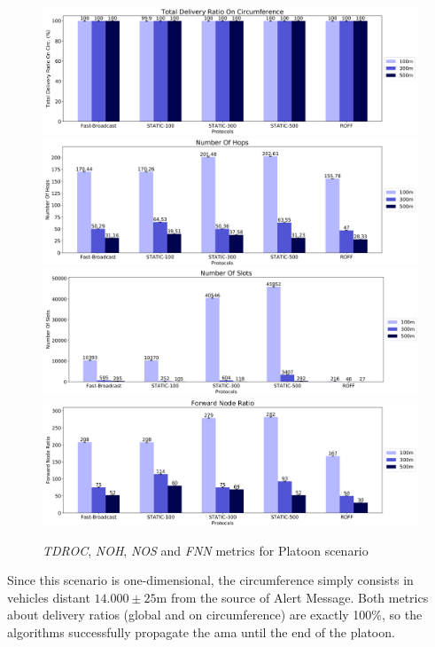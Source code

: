 		\begin{figure}[H]
			\centering
			\includegraphics[width=1.1\textwidth]{immagini/platoon-15km/tdroc}
			\includegraphics[width=1.1\textwidth]{immagini/platoon-15km/noh}
			\includegraphics[width=1.1\textwidth]{immagini/platoon-15km/nos}
			\includegraphics[width=1.1\textwidth]{immagini/platoon-15km/fnn}
			\caption{\textit{TDROC}, \textit{NOH}, \textit{NOS} and \textit{FNN} metrics for Platoon scenario}
			\label{fig:metric-platoon-15km-1}
		\end{figure}
	
		\newpage
	
		Since this scenario is one-dimensional, the circumference simply consists in vehicles distant $14.000  \pm 25$m from the source of Alert Message. Both metrics about delivery ratios (global and on circumference) are exactly 100\%, so the algorithms successfully propagate the \acrshort{ama} until the end of the platoon.
		
